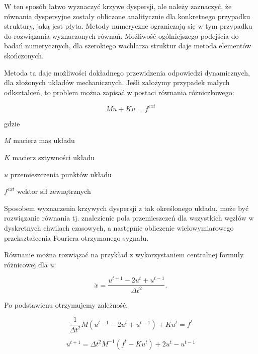 \vspace{5mm}

W ten sposób łatwo wyznaczyć krzywe dyspersji, ale należy zaznaczyć, że równania dyspersyjne zostały obliczone analitycznie dla konkretnego przypadku struktury, jaką jest płyta. Metody numeryczne ograniczają się w tym przypadku do rozwiązania wyznaczonych równań. Możliwość ogólniejszego podejścia do badań numerycznych, dla szerokiego wachlarza struktur daje metoda elementów skończonych.

Metoda ta daje możliwości dokładnego przewidzenia odpowiedzi dynamicznych, dla złożonych układów mechanicznych. Jeśli założymy przypadek małych odkształceń, to problem można zapisać w postaci równania różniczkowego:

\begin{equation} \label{eq:MES1}
M\ddot u + Ku = f^{ext}
\end{equation}

gdzie
\begin{eqwhere}[2cm]
        \item[$M$] macierz mas układu
        \item[$K$] macierz sztywności układu 
        \item[$u$] przemieszczenia punktów układu
        \item[$f^{ext}$] wektor sił zewnętrznych
\end{eqwhere}

Sposobem wyznaczenia krzywych dyspersji z tak określonego układu, może być rozwiązanie równania tj. znalezienie pola przemieszczeń dla wszystkich węzłów w dyskretnych chwilach czasowych, a następnie obliczenie wielowymiarowego przekształcenia Fouriera otrzymanego sygnału.

Równanie można rozwiązać na przykład z wykorzystaniem centralnej formuły różnicowej dla \( \ddot u\):

\begin{equation}
\ddot x = \frac{u^{t+1} - 2u^t + u^{t-1}}{\Delta t^2}.
\end{equation}

Po podstawienu otrzymujemy zależność:

\begin{equation}
\frac{1}{\Delta t^2}M(u^{t-1}-2u^t+u^{t-1}) + Ku^t = f^t
\end{equation}

\begin{equation}
u^{t+1}=\Delta t^2 M^{-1}(f^t -Ku^t)+2u^t-u^{t-1}
\end{equation}


